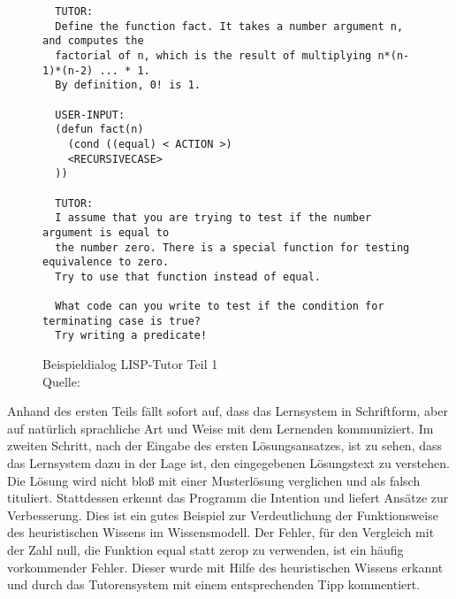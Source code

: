
\begin{figure}[!ht]
\begin{lstlisting}
  TUTOR:
  Define the function fact. It takes a number argument n, and computes the
  factorial of n, which is the result of multiplying n*(n-1)*(n-2) ... * 1.
  By definition, 0! is 1.

  USER-INPUT:
  (defun fact(n)
    (cond ((equal) < ACTION >)
    <RECURSIVECASE>
  ))

  TUTOR:
  I assume that you are trying to test if the number argument is equal to
  the number zero. There is a special function for testing equivalence to zero.
  Try to use that function instead of equal.

  What code can you write to test if the condition for terminating case is true?
  Try writing a predicate!
\end{lstlisting}
\caption[Beispieldialog LISP-Tutor Teil 1]{Beispieldialog LISP-Tutor Teil 1 \\ Quelle: \cite[S. 173]{anderson1985}}
\end{figure}

Anhand des ersten Teils fällt sofort auf, dass das Lernsystem in Schriftform, aber
auf natürlich sprachliche Art und Weise mit dem Lernenden kommuniziert.
Im zweiten Schritt, nach der Eingabe des ersten Lösungsansatzes, ist zu sehen,
dass das Lernsystem dazu in der Lage ist, den eingegebenen Lösungstext zu verstehen.
Die Lösung wird nicht bloß mit einer Musterlösung verglichen und als falsch tituliert.
Stattdessen erkennt das Programm die Intention und liefert Ansätze zur Verbesserung.
Dies ist ein gutes Beispiel zur Verdeutlichung der Funktionsweise des heuristischen Wissens
im Wissensmodell. Der Fehler, für den Vergleich mit der Zahl null, die Funktion
equal statt zerop zu verwenden, ist ein häufig vorkommender Fehler. Dieser wurde mit Hilfe
des heuristischen Wissens erkannt und durch das Tutorensystem mit einem entsprechenden Tipp
kommentiert.
\newpage


